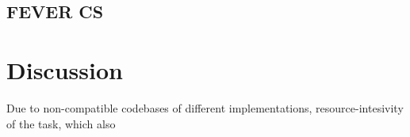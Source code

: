 \subsection{\CTK}
\subsection{FEVER CS}

\section{Discussion}

Due to non-compatible codebases of different implementations, resource-intesivity of the task, which also 